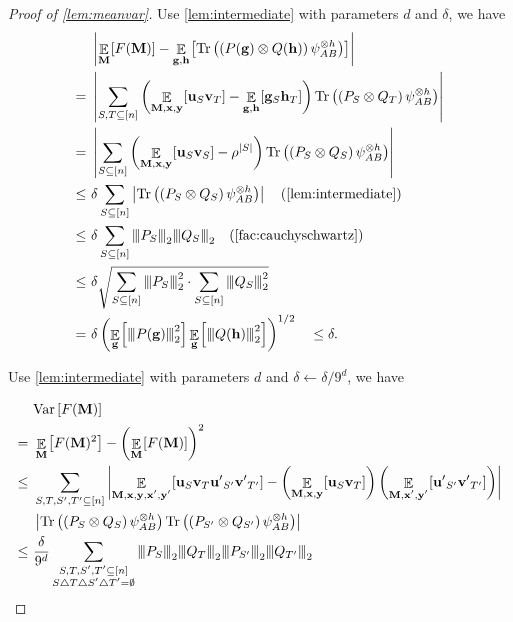 \documentclass[11pt]{article}
\theoremstyle{plain}
\theoremstyle{definition}
\newcommand {\minusspace} {\: \! \!}
\newcommand {\Fn} [2] {\ensuremath{ #1 \minusspace \Br{ #2 } }}
\newcommand {\br} [1] {\ensuremath{ \left( #1 \right) }}
\newcommand {\Br} [1] {\ensuremath{ \left[ #1 \right] }}
\newcommand {\ab} [1] {\ensuremath{ \left| #1 \right| }}
\DeclareMathOperator*{\bigE}{\mathbb{E}}
\newcommand {\expec} [2] {\Fn{\bigE_{\substack{#1}}}{#2}}
\newcommand{\nnorm}[1]{{\left\vert\kern-0.25ex\left\vert\kern-0.25ex\left\vert #1
		\right\vert\kern-0.25ex\right\vert\kern-0.25ex\right\vert}}
\newcommand {\Tr} {\ensuremath{ \mathrm{Tr} }}
\newcommand{\randg}{\ensuremath{\mathbf{g}}}
\newcommand{\randh}{\ensuremath{\mathbf{h}}}
\newcommand{\randu}{\ensuremath{\mathbf{u}}}
\newcommand{\randv}{\ensuremath{\mathbf{v}}}
\newcommand {\var} [1] {\mathrm{Var}\Br{#1}}
\newcommand{\1}{\mathbb{1}} %
\begin{document}
\begin{proof}[Proof of \cref{lem:meanvar}]
Use \cref{lem:intermediate} with parameters $d$ and $\delta$, we have 
\begin{align*}
&\ab{\expec{\mathbf{M}}{F(\mathbf{M})}-\expec{\mathbf{g},\mathbf{h}}{\Tr\br{\br{P(\randg)\otimes Q(\randh)}\psi_{AB}^{\otimes h}}}}\\
=~&\ab{\sum_{S,T\subseteq[n]}\br{\expec{\mathbf{M},\mathbf{x},\mathbf{y}}{\mathbf\randu_S\mathbf\randv_T}-\expec{\mathbf{g},\mathbf{h}}{\mathbf{g}_S\mathbf{h}_T}}\Tr\br{\br{ P_S\otimes Q_T}\psi_{AB}^{\otimes h}}}\\
=~&\ab{\sum_{S\subseteq[n]}\br{\expec{\mathbf{M},\mathbf{x},\mathbf{y}}{\mathbf\randu_S\mathbf\randv_S}-\rho^{\ab{S}}}\Tr\br{\br{ P_S\otimes Q_S}\psi_{AB}^{\otimes h}}}\\
\leq~&\delta\sum_{S\subseteq[n]}\ab{\Tr\br{\br{ P_S\otimes Q_S}\psi_{AB}^{\otimes h}}}\quad\mbox{(\cref{lem:intermediate})}\\
\leq~&\delta\sum_{S\subseteq[n]}\nnorm{ P_S}_2\nnorm{ Q_S}_2\quad\mbox{(\cref{fac:cauchyschwartz})}\\
\leq~&\delta\sqrt{\sum_{S\subseteq[n]}\nnorm{ P_S}_2^2\cdot\sum_{S\subseteq[n]}\nnorm{ Q_S}_2^2}\\
=~&\delta \br{\expec{\randg}{\nnorm{P(\randg)}_2^2}\expec{\randg}{\nnorm{Q(\randh)}_2^2}}^{1/2}\quad\leq\delta.\\
\end{align*}

Use \cref{lem:intermediate} with parameters $d$ and $\delta\leftarrow\delta/9^d$, we have 

\begin{align*}
&\var{F(\mathbf{M})}\\
=~&\expec{\mathbf{M}}{F(\mathbf{M})^2}-\br{\expec{\mathbf{M}}{F(\mathbf{M})}}^2\\
\leq~&\sum_{S,T,S',T'\subseteq[n]}\ab{\expec{\mathbf{M},\mathbf{x},\mathbf{y},\mathbf{x'},\mathbf{y'}}{\mathbf\randu_S\mathbf\randv_T\mathbf{u'}_{S'}\mathbf{v'}_{T'}}-\br{\expec{\mathbf{M},\mathbf{x},\mathbf{y}}{\mathbf\randu_S\mathbf\randv_T}}\br{\expec{\mathbf{M},\mathbf{x'},\mathbf{y'}}{\mathbf{u'}_{S'}\mathbf{v'}_{T'}}}}\\
&\ab{\Tr\br{\br{ P_S\otimes Q_S}\psi_{AB}^{\otimes h}}\Tr\br{\br{ P_{S'}\otimes Q_{S'}}\psi_{AB}^{\otimes h}}}\\
\leq~&\frac{\delta}{9^d}\sum_{\substack{S,T,S',T'\subseteq[n]\\ S\bigtriangleup T\bigtriangleup S'\bigtriangleup T'=\emptyset}}\nnorm{ P_S}_2\nnorm{ Q_T}_2\nnorm{ P_{S'}}_2\nnorm{ Q_{T'}}_2
\end{align*}


\end{proof}
\end{document}
